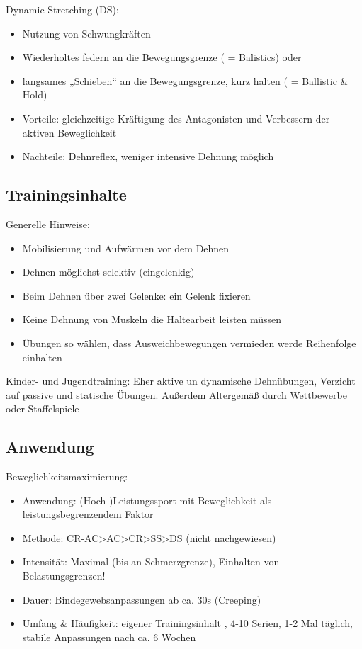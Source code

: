 Dynamic Stretching (DS):
\begin{itemize}
    \item Nutzung von Schwungkräften
    \item Wiederholtes federn an die Bewegungsgrenze ( = Balistics) oder
    \item langsames „Schieben“ an die Bewegungsgrenze, kurz halten ( = Ballistic \& Hold)
    \item Vorteile: gleichzeitige Kräftigung des Antagonisten und Verbessern der aktiven Beweglichkeit
    \item Nachteile: Dehnreflex, weniger intensive Dehnung möglich
\end{itemize}

\subsection{Trainingsinhalte}

Generelle Hinweise:
\begin{itemize}
    \item Mobilisierung und Aufwärmen vor dem Dehnen
    \item Dehnen möglichst selektiv (eingelenkig)
    \item Beim Dehnen über zwei Gelenke: ein Gelenk fixieren
    \item Keine Dehnung von Muskeln die Haltearbeit leisten müssen
    \item Übungen so wählen, dass Ausweichbewegungen vermieden werde Reihenfolge einhalten
\end{itemize}

Kinder- und Jugendtraining: Eher aktive un dynamische Dehnübungen, Verzicht auf passive und statische Übungen. Außerdem Altergemäß durch Wettbewerbe oder Staffelspiele

\subsection{Anwendung}

Beweglichkeitsmaximierung:
\begin{itemize}
    \item Anwendung: (Hoch-)Leistungssport mit Beweglichkeit als leistungsbegrenzendem Faktor
    \item Methode: CR-AC>AC>CR>SS>DS (nicht nachgewiesen)
    \item Intensität: Maximal (bis an Schmerzgrenze), Einhalten von Belastungsgrenzen!
    \item Dauer: Bindegewebsanpassungen ab ca. 30s (Creeping)
    \item Umfang \& Häufigkeit: eigener Trainingsinhalt , 4-10 Serien, 1-2 Mal täglich, stabile Anpassungen nach ca. 6 Wochen
\end{itemize}

